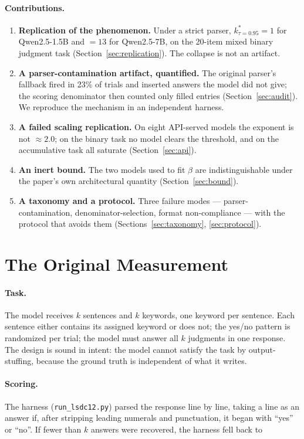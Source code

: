 \documentclass[preprint,12pt]{elsarticle}
\theoremstyle{plain}
\begin{document}
\paragraph{Contributions.}
\begin{enumerate}
\item \textbf{Replication of the phenomenon.} Under a strict parser, $k^*_{\tau=0.95} = 1$ for Qwen2.5-1.5B and $= 13$ for Qwen2.5-7B, on the 20-item mixed binary judgment task (Section~\ref{sec:replication}). The collapse is not an artifact.
\item \textbf{A parser-contamination artifact, quantified.} The original parser's fallback fired in 23\% of trials and inserted answers the model did not give; the scoring denominator then counted only filled entries (Section~\ref{sec:audit}). We reproduce the mechanism in an independent harness.
\item \textbf{A failed scaling replication.} On eight API-served models the exponent is not $\approx 2.0$; on the binary task no model clears the threshold, and on the accumulative task all saturate (Section~\ref{sec:api}).
\item \textbf{An inert bound.} The two models used to fit $\beta$ are indistinguishable under the paper's own architectural quantity (Section~\ref{sec:bound}).
\item \textbf{A taxonomy and a protocol.} Three failure modes --- parser-contamination, denominator-selection, format non-compliance --- with the protocol that avoids them (Sections~\ref{sec:taxonomy}, \ref{sec:protocol}).
\end{enumerate}

\section{The Original Measurement}
\label{sec:original}

\paragraph{Task.} The model receives $k$ sentences and $k$ keywords, one keyword per sentence. Each sentence either contains its assigned keyword or does not; the yes/no pattern is randomized per trial; the model must answer all $k$ judgments in one response. The design is sound in intent: the model cannot satisfy the task by output-stuffing, because the ground truth is independent of what it writes.

\paragraph{Scoring.} The harness (\texttt{run\_lsdc12.py}) parsed the response line by line, taking a line as an answer if, after stripping leading numerals and punctuation, it began with ``yes'' or ``no''. If fewer than $k$ answers were recovered, the harness fell back to
\end{document}

